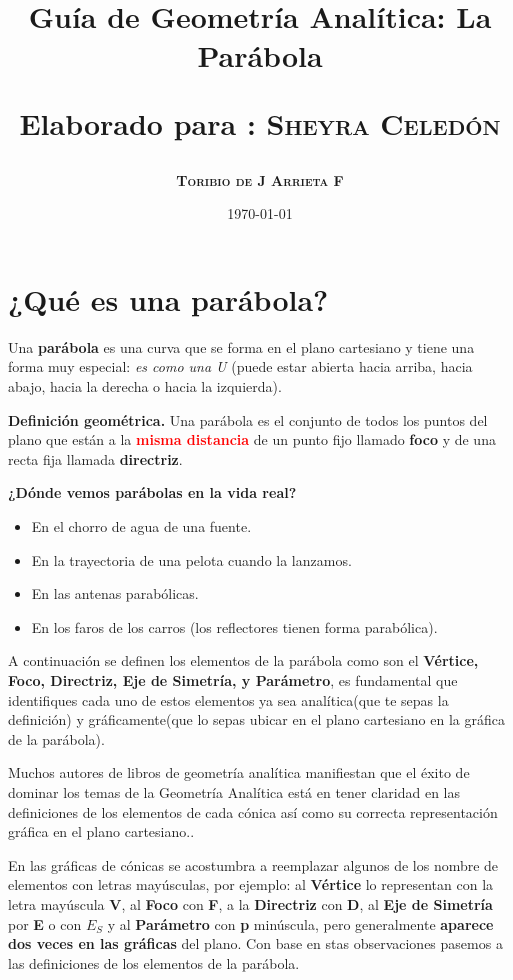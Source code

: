 \documentclass[12pt,a4paper]{article}
\title{\Large Guía de Geometría Analítica: La Parábola

\small{Elaborado para : \textsc{\bf{Sheyra Celedón}}}}
\author{\bf{\textsc{Toribio de J Arrieta F}}}
\date{\today}
\begin{document}
	\maketitle

	\section{¿Qué es una parábola?}

	Una \textbf{parábola} es una curva que se forma en el plano cartesiano y tiene una forma muy especial: \emph{es como una U} (puede estar abierta hacia arriba, hacia abajo, hacia la derecha o hacia la izquierda).

	\bigskip

	\textbf{Definición geométrica.} Una parábola es el conjunto de todos los puntos del plano que están a la \textcolor{red}{\textbf{misma distancia}} de un punto fijo llamado \textbf{foco} y de una recta fija llamada \textbf{directriz}.

	\bigskip

	\textbf{¿Dónde vemos parábolas en la vida real?}
	\begin{itemize}
		\item En el chorro de agua de una fuente.
		\item En la trayectoria de una pelota cuando la lanzamos.
		\item En las antenas parabólicas.
		\item En los faros de los carros (los reflectores tienen forma parabólica).
	\end{itemize}
	
	\bigskip
	
	A continuación se definen los elementos de la parábola como son el \textbf{Vértice, Foco, Directriz, Eje de Simetría, y Parámetro}, es fundamental que identifiques cada uno de estos elementos ya sea analítica(que te sepas la definición) y gráficamente(que lo sepas ubicar en el plano cartesiano en la gráfica de la parábola).
	
	\bigskip
	
	Muchos autores de libros de geometría analítica manifiestan que el éxito de dominar los temas de la Geometría Analítica está en tener claridad en las definiciones de los elementos de cada cónica así como su correcta representación gráfica en el plano cartesiano..
	
	\bigskip
	
	En las gráficas de cónicas se acostumbra a reemplazar algunos de los nombre de elementos con letras mayúsculas, por ejemplo: al \textbf{Vértice} lo representan con la letra mayúscula \textbf{V}, al \textbf{Foco} con \textbf{F}, a la \textbf{Directriz} con \textbf{D}, al \textbf{Eje de Simetría} por \textbf{E} o con \textbf{$E_S$} y al \textbf{Parámetro} con \textbf{p} minúscula, pero generalmente \textbf{aparece dos veces en las gráficas} del plano. Con base en stas observaciones pasemos a las definiciones de los elementos de la parábola.
\end{document}
